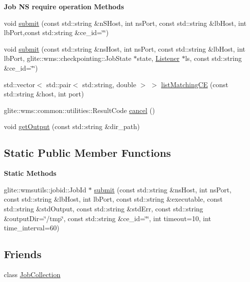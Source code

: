 \begin{Indent}{\bf Job NS require operation Methods}\par
\begin{CompactItemize}
\item 
void \hyperlink{classglite_1_1wmsui_1_1api_1_1Job_z23_0}{submit} (const std::string \&n\-SHost, int ns\-Port, const std::string \&lb\-Host, int lb\-Port,const std::string \&ce\_\-id=\char`\"{}\char`\"{})
\item 
void \hyperlink{classglite_1_1wmsui_1_1api_1_1Job_z23_1}{submit} (const std::string \&ns\-Host, int ns\-Port, const std::string \&lb\-Host, int lb\-Port, glite::wms::checkpointing::Job\-State $\ast$state, \hyperlink{classglite_1_1wmsui_1_1api_1_1Listener}{Listener} $\ast$ls, const std::string \&ce\_\-id=\char`\"{}\char`\"{})
\item 
std::vector$<$ std::pair$<$ std::string, double $>$ $>$ \hyperlink{classglite_1_1wmsui_1_1api_1_1Job_z23_2}{list\-Matching\-CE} (const std::string \&host, int port)
\item 
glite::wms::common::utilities::Result\-Code \hyperlink{classglite_1_1wmsui_1_1api_1_1Job_z23_3}{cancel} ()
\item 
void \hyperlink{classglite_1_1wmsui_1_1api_1_1Job_z23_4}{get\-Output} (const std::string \&dir\_\-path)
\end{CompactItemize}
\end{Indent}
\subsection*{Static Public Member Functions}
\begin{Indent}{\bf Static Methods}\par
\begin{CompactItemize}
\item 
glite::wmsutils::jobid::Job\-Id $\ast$ \hyperlink{classglite_1_1wmsui_1_1api_1_1Job_z25_0}{submit} (const std::string \&ns\-Host, int ns\-Port, const std::string \&lb\-Host, int lb\-Port, const std::string \&executable, const std::string \&std\-Output, const std::string \&std\-Err, const std::string \&output\-Dir=\char`\"{}/tmp\char`\"{}, const std::string \&ce\_\-id=\char`\"{}\char`\"{}, int timeout=10, int time\_\-interval=60)
\end{CompactItemize}
\end{Indent}
\subsection*{Friends}
\begin{CompactItemize}
\item 
class \hyperlink{classglite_1_1wmsui_1_1api_1_1Job_n0}{Job\-Collection}
\end{CompactItemize}


